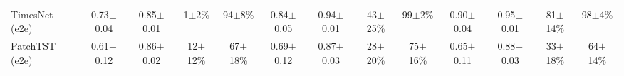 \begin{table}[t]
\begin{tabular*}{\textwidth}{@{\extracolsep{\fill}}lcccccccccccc@{}}
    TimesNet (e2e) & 0.73{\tiny$\pm$0.04} & 0.85{\tiny$\pm$0.01} & 1{\tiny$\pm$2}\% & 94{\tiny$\pm$8}\% & 0.84{\tiny$\pm$0.05} & 0.94{\tiny$\pm$0.01} & 43{\tiny$\pm$25}\% & 99{\tiny$\pm$2}\% & 0.90{\tiny$\pm$0.04} & 0.95{\tiny$\pm$0.01} & 81{\tiny$\pm$14}\% & 98{\tiny$\pm$4}\% \\
    PatchTST (e2e) & 0.61{\tiny$\pm$0.12} & 0.86{\tiny$\pm$0.02} & 12{\tiny$\pm$12}\% & 67{\tiny$\pm$18}\% & 0.69{\tiny$\pm$0.12} & 0.87{\tiny$\pm$0.03} & 28{\tiny$\pm$20}\% & 75{\tiny$\pm$16}\% & 0.65{\tiny$\pm$0.11} & 0.88{\tiny$\pm$0.03} & 33{\tiny$\pm$18}\% & 64{\tiny$\pm$14}\% \\
    \bottomrule
  \end{tabular*}
\end{table}
